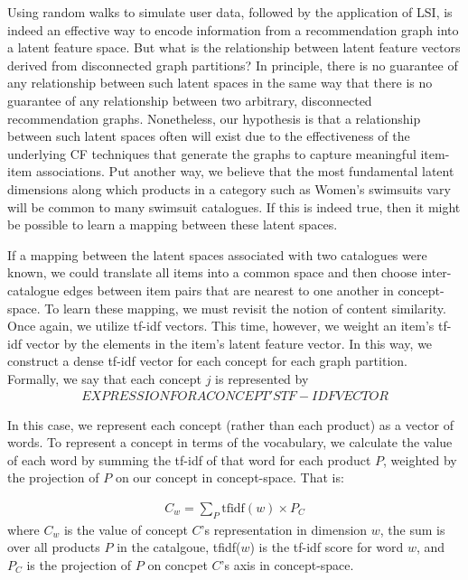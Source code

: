 \documentclass[11pt]{article}
\begin{document}
Using random walks to simulate user data, followed by the application of LSI, is
indeed an effective way to encode information from a recommendation graph into a
latent feature space. But what is the relationship between latent feature
vectors derived from disconnected graph partitions? In principle, there is no
guarantee of any relationship between such latent spaces in the same way that
there is no guarantee of any relationship between two arbitrary, disconnected
recommendation graphs. Nonetheless, our hypothesis is that a relationship
between such latent spaces often will exist due to the effectiveness of the
underlying CF techniques that generate the graphs to capture meaningful
item-item associations. Put another way, we believe that the most fundamental
latent dimensions along which products in a category such as Women's swimsuits
vary will be common to many swimsuit catalogues. If this is indeed true, then it
might be possible to learn a mapping between these latent spaces.

If a mapping between the latent spaces associated with two catalogues were
known, we could translate all items into a common space and then choose
inter-catalogue edges between item pairs that are nearest to one another in
concept-space. To learn these mapping, we must revisit the notion of content
similarity. Once again, we utilize tf-idf vectors. This time, however, we weight
an item's tf-idf vector by the elements in the item's latent feature vector. In
this way, we construct a dense tf-idf vector for each concept for each graph
partition. Formally, we say that each concept $j$ is represented by 
\begin{align}
EXPRESSION FOR A CONCEPT'S TF-IDF VECTOR
\end{align}

In this case, we represent each concept (rather than each
product) as a vector of words. To represent a concept in terms of the
vocabulary, we calculate the value of each word by summing the tf-idf of that
word for each product $P$, weighted by the projection of $P$ on our concept in
concept-space. That is:

\begin{align}
C_w = \sum\limits_{P} \text{tfidf}(w)\times P_C
\end{align}
where $C_w$ is the value of concept $C$'s representation in dimension $w$, the
sum is over all products $P$ in the catalgoue, tfidf($w$) is the tf-idf score
for word $w$, and $P_C$ is the projection of $P$ on concpet $C$'s axis in
concept-space.
\end{document}

